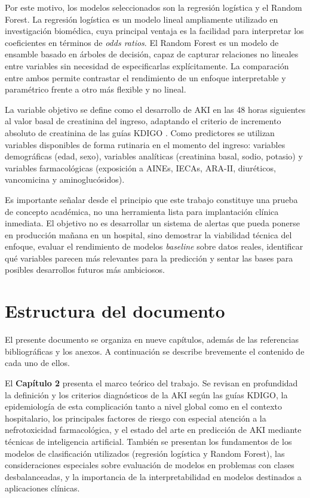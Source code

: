 \documentclass[12pt, a4paper, oneside]{report}
\begin{document}
Por este motivo, los modelos seleccionados son la regresión logística y el Random Forest. La regresión logística es un modelo lineal ampliamente utilizado en investigación biomédica, cuya principal ventaja es la facilidad para interpretar los coeficientes en términos de \textit{odds ratios}. El Random Forest es un modelo de ensamble basado en árboles de decisión, capaz de capturar relaciones no lineales entre variables sin necesidad de especificarlas explícitamente. La comparación entre ambos permite contrastar el rendimiento de un enfoque interpretable y paramétrico frente a otro más flexible y no lineal.

La variable objetivo se define como el desarrollo de AKI en las 48 horas siguientes al valor basal de creatinina del ingreso, adaptando el criterio de incremento absoluto de creatinina de las guías KDIGO \parencite{kdigo2012aki}. Como predictores se utilizan variables disponibles de forma rutinaria en el momento del ingreso: variables demográficas (edad, sexo), variables analíticas (creatinina basal, sodio, potasio) y variables farmacológicas (exposición a AINEs, IECAs, ARA-II, diuréticos, vancomicina y aminoglucósidos).

Es importante señalar desde el principio que este trabajo constituye una prueba de concepto académica, no una herramienta lista para implantación clínica inmediata. El objetivo no es desarrollar un sistema de alertas que pueda ponerse en producción mañana en un hospital, sino demostrar la viabilidad técnica del enfoque, evaluar el rendimiento de modelos \textit{baseline} sobre datos reales, identificar qué variables parecen más relevantes para la predicción y sentar las bases para posibles desarrollos futuros más ambiciosos.

\section{Estructura del documento}

El presente documento se organiza en nueve capítulos, además de las referencias bibliográficas y los anexos. A continuación se describe brevemente el contenido de cada uno de ellos.

El \textbf{Capítulo 2} presenta el marco teórico del trabajo. Se revisan en profundidad la definición y los criterios diagnósticos de la AKI según las guías KDIGO, la epidemiología de esta complicación tanto a nivel global como en el contexto hospitalario, los principales factores de riesgo con especial atención a la nefrotoxicidad farmacológica, y el estado del arte en predicción de AKI mediante técnicas de inteligencia artificial. También se presentan los fundamentos de los modelos de clasificación utilizados (regresión logística y Random Forest), las consideraciones especiales sobre evaluación de modelos en problemas con clases desbalanceadas, y la importancia de la interpretabilidad en modelos destinados a aplicaciones clínicas.
\end{document}

